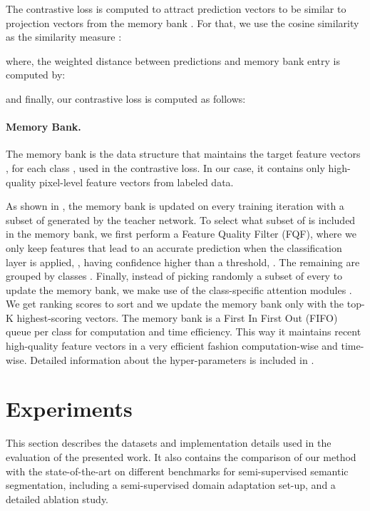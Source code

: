 \documentclass[10pt,twocolumn,letterpaper]{article}
\begin{document}
The contrastive loss is computed to attract prediction vectors  to be similar to projection vectors from the memory bank . For that, we use the cosine similarity as the similarity measure : 

where, the weighted distance between predictions and memory bank entry is computed by: 

and finally, our contrastive loss is computed as follows: 





\paragraph{Memory Bank.}
The memory bank is the data structure that maintains the target feature vectors ,  for each class , used in the contrastive loss. In our case, it contains only high-quality pixel-level feature vectors from labeled data.
 
As shown in , the memory bank is updated on every training iteration with a subset of  generated by the teacher network. To select what subset of  is included in the memory bank, we first perform a Feature Quality Filter (FQF), where we only keep features that lead to an accurate prediction when the classification layer is applied, , having confidence higher than a threshold, . 
The remaining  are grouped by classes . Finally, instead of picking randomly a subset of every  to update the memory bank, we make use of the class-specific attention modules . We get ranking scores  to sort  and we update the memory bank only with the top-K highest-scoring vectors. The memory bank is a First In First Out (FIFO) queue per class for computation and time efficiency. This way it maintains recent high-quality feature vectors in a very efficient fashion computation-wise and time-wise. Detailed information about the hyper-parameters is included in .



 
\section{Experiments}
\label{sec:experiments}
This section describes the datasets and implementation details used in the evaluation of the presented work. It also contains the comparison of our method with the state-of-the-art on different benchmarks for semi-supervised semantic segmentation, including a semi-supervised domain adaptation set-up, and a detailed ablation study. 
\end{document}
